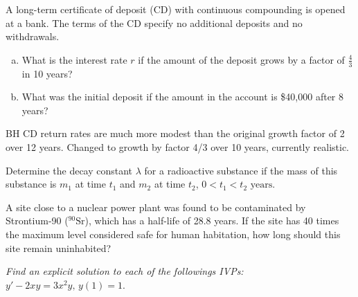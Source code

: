 \documentclass[12pt]{book}
\begin{document}
\begin{exercise}
A long-term certificate of deposit (CD) with continuous compounding is opened at a bank. The terms of the CD specify no additional deposits and no withdrawals. 
\begin{enumerate}[a.]
    \item What is the interest rate $r$ if the amount of the deposit 
    {\color{blue}grows by a factor of $\frac{4}{3}$ in 10 years?}
    \item What was the initial deposit if the amount in the account is \$40,000 after 8 years?
\end{enumerate}
{\color{teal}BH CD return rates are much more modest than the original growth
factor of 2 over 12 years. Changed to growth by factor 4/3 over 10 years,
currently realistic.}
\end{exercise}


\begin{exercise}
Determine the decay constant $\lambda$ for a radioactive substance if the mass of this substance is $m_1$ at time
$t_1$ and $m_2$ at time $t_2$, $0<t_1<t_2 \,\, \text{years}.$
\end{exercise}

\begin{exercise}
A site close to a nuclear power plant was found to be contaminated by Strontium-90 (${}^{90}\text{Sr}$),
which has a half-life of 28.8 years. If the site has 40 times the maximum level considered safe
for human habitation, how long should this site remain uninhabited?

\end{exercise}


\vspace{3mm}

\begin{exercise}
\textit{Find an explicit solution to each of the followings IVPs:}
$y' - 2xy = 3x^2y,\, y(1)= 1$.
\end{exercise}
\end{document}
